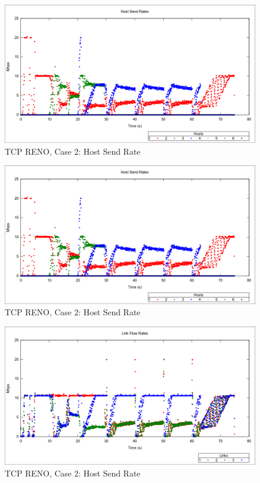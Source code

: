 \begin{figure}[htbp]
    \centering
    \includegraphics[width=\textwidth]{reno2/Host_Send.png}
    \caption{TCP RENO, Case 2: Host Send Rate}
\end{figure}

\begin{figure}[htbp]
    \centering
    \includegraphics[width=\textwidth]{reno2/Host_Send.png}
    \caption{TCP RENO, Case 2: Host Send Rate}
\end{figure}


\begin{figure}[htbp]
    \centering
    \includegraphics[width=\textwidth]{reno2/Link_Flow_Rate.png}
    \caption{TCP RENO, Case 2: Host Send Rate}
\end{figure}


